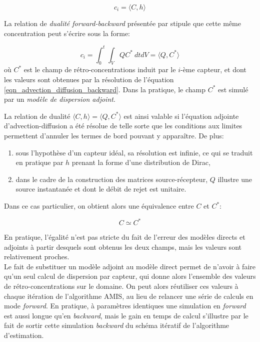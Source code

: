 \begin{equation}
c_i = \langle	C,h\rangle
\label{eq_scal_direct}
\end{equation} 

La relation de \textit{dualité forward-backward} présentée par \cite{Keats2007} stipule que cette même concentration peut s'écrire sous la forme:

\begin{equation}
c_i = \int_0^t \int_V Q C^* ~ dtdV = \langle Q, C^*\rangle
\label{eq_int_adjoint}
\end{equation}
où $C^*$ est le champ de rétro-concentrations induit par le $i$-ème capteur, et dont les valeurs sont obtenues par la résolution de l'équation \eqref{eqn_advection_diffusion_backward}. Dans la pratique, le champ $C^*$ est simulé par un \textit{modèle de dispersion adjoint}.

La relation de dualité $\langle C,h\rangle = \langle Q,C^* \rangle$ est ainsi valable si l'équation adjointe d'advection-diffusion a été résolue de telle sorte que les conditions aux limites permettent d'annuler les termes de bord pouvant y apparaître. De plus:

\begin{enumerate}
	\item sous l'hypothèse d'un capteur idéal, sa résolution est infinie, ce qui se traduit en pratique par $h$ prenant la forme d'une distribution de Dirac,
	\item dans le cadre de la construction des matrices source-récepteur, $Q$ illustre une source instantanée et dont le débit de rejet est unitaire.
\end{enumerate}

Dans ce cas particulier, on obtient alors une équivalence entre $C$ et $C^*$: 

\begin{equation}
C \simeq C^*
\label{eq_equivalence}
\end{equation}

En pratique, l'égalité n'est pas stricte du fait de l'erreur des modèles directs et adjoints à partir desquels sont obtenus les deux champs, mais les valeurs sont relativement proches. \\

Le fait de substituer un modèle adjoint au modèle direct permet de n'avoir à faire qu'un seul calcul de dispersion par capteur, qui donne alors l'ensemble des valeurs de rétro-concentrations sur le domaine. On peut alors réutiliser ces valeurs à chaque itération de l'algorithme AMIS, au lieu de relancer une série de calculs en mode \textit{forward}. En pratique, à paramètres identiques une simulation en \textit{forward} est aussi longue qu'en \textit{backward}, mais le gain en temps de calcul s'illustre par le fait de sortir cette simulation \textit{backward} du schéma itératif de l'algorithme d'estimation.



